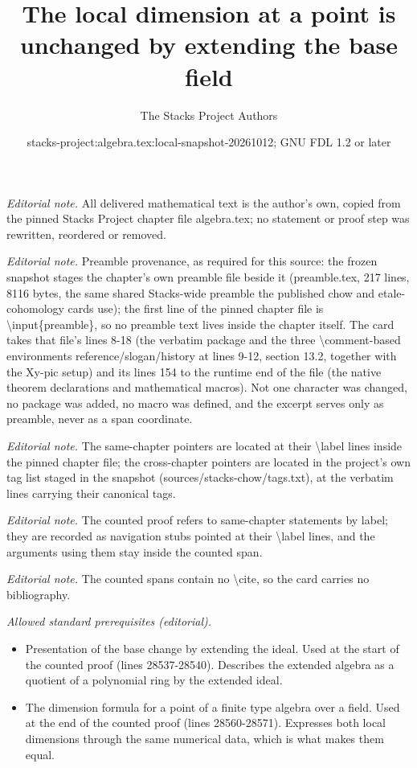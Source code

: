 \documentclass[10pt,a4paper]{amsart}
\title{The local dimension at a point is unchanged by extending the base field}
\author{The Stacks Project Authors}
\date{stacks-project:algebra.tex:local-snapshot-20261012; GNU FDL 1.2 or later}
\theoremstyle{plain}
\theoremstyle{definition}
\theoremstyle{remark}
\numberwithin{equation}{subsection}
\begin{document}
\maketitle
\noindent\textit{Editorial note.} All delivered mathematical text is the author's own, copied from the pinned Stacks Project chapter file algebra.tex; no statement or proof step was rewritten, reordered or removed.\par\medskip
\noindent\textit{Editorial note.} Preamble provenance, as required for this source: the frozen snapshot stages the chapter's own preamble file beside it (preamble.tex, 217 lines, 8116 bytes, the same shared Stacks-wide preamble the published chow and etale-cohomology cards use); the first line of the pinned chapter file is \textbackslash{}input\{preamble\}, so no preamble text lives inside the chapter itself. The card takes that file's lines 8-18 (the verbatim package and the three \textbackslash{}comment-based environments reference/slogan/history at lines 9-12, section 13.2, together with the Xy-pic setup) and its lines 154 to the runtime end of the file (the native theorem declarations and mathematical macros). Not one character was changed, no package was added, no macro was defined, and the excerpt serves only as preamble, never as a span coordinate.\par\medskip
\noindent\textit{Editorial note.} The same-chapter pointers are located at their \textbackslash{}label lines inside the pinned chapter file; the cross-chapter pointers are located in the project's own tag list staged in the snapshot (sources/stacks-chow/tags.txt), at the verbatim lines carrying their canonical tags.\par\medskip
\noindent\textit{Editorial note.} The counted proof refers to same-chapter statements by label; they are recorded as navigation stubs pointed at their \textbackslash{}label lines, and the arguments using them stay inside the counted span.\par\medskip
\noindent\textit{Editorial note.} The counted spans contain no \textbackslash{}cite, so the card carries no bibliography.\par\medskip
\noindent\textit{Allowed standard prerequisites (editorial).}\begin{itemize}
\item Presentation of the base change by extending the ideal. Used at the start of the counted proof (lines 28537-28540). Describes the extended algebra as a quotient of a polynomial ring by the extended ideal.
\item The dimension formula for a point of a finite type algebra over a field. Used at the end of the counted proof (lines 28560-28571). Expresses both local dimensions through the same numerical data, which is what makes them equal.
\end{itemize}\medskip
\end{document}
